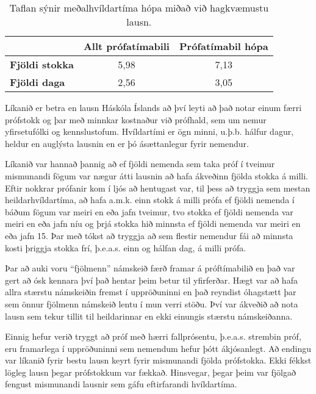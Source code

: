 \documentclass[12pt]{article}
\begin{document}
\newpage
\begin{table}[h]
    \centering
    \begin{tabular}{l|c|c|}
        \cline{2-3}
        & \multicolumn{1}{l|}{\textbf{Allt prófatímabili}} & \multicolumn{1}{l|}{\textbf{Prófatímabil hópa}} \\ \hline
        \multicolumn{1}{|l|}{\textbf{Fjöldi stokka}} & 5,98                                             & 7,13                                            \\ \hline
        \multicolumn{1}{|l|}{\textbf{Fjöldi daga}}   & 2,56                                             & 3,05                                            \\ \hline
    \end{tabular}
    \caption{Taflan sýnir meðalhvíldartíma hópa miðað við hagkvæmustu lausn. }
\end{table}

Líkanið er betra en lausn Háskóla Íslands að því leyti að það notar einum færri prófstokk og þar með minnkar kostnaður við prófhald, sem um nemur yfirsetufólki og kennslustofum. Hvíldartími er ögn minni, u.þ.b. hálfur dagur, heldur en auglýsta lausnin en er þó ásættanlegur fyrir nemendur. 

\medskip
Líkanið var hannað þannig að ef fjöldi nemenda sem taka próf í tveimur mismunandi fögum var nægur átti lausnin að hafa ákveðinn fjölda stokka á milli. Eftir nokkrar prófanir kom í ljós að hentugast var, til þess að tryggja sem mestan heildarhvíldartíma, að hafa a.m.k. einn stokk á milli prófa ef fjöldi nemenda í báðum fögum var meiri en eða jafn tveimur,  tvo stokka ef fjöldi nemenda var meiri en eða jafn níu og þrjá stokka hið minnsta ef fjöldi nemenda var meiri en eða jafn 15. Þar með tókst að tryggja að sem flestir nemendur fái að minnsta kosti þriggja stokka frí, þ.e.a.s. einn og hálfan dag, á milli prófa. 

\medskip
Þar að auki voru “fjölmenn” námskeið færð framar á próftímabilið en það var gert að ósk kennara því það hentar þeim betur til yfirferðar. Hægt var að hafa allra stærstu námskeiðin fremst í uppröðuninni en það reyndist óhagstætt þar sem önnur fjölmenn námskeið lentu í mun verri stöðu. Því var ákveðið að nota lausn sem tekur tillit til heildarinnar en ekki einungis stærstu námskeiðanna.

\medskip
Einnig hefur verið tryggt að próf með hærri fallprósentu, þ.e.a.s. strembin próf, eru framarlega í uppröðuninni sem nemendum hefur þótt ákjósanlegt. 
Að endingu var líkanið fyrir bestu lausn keyrt fyrir mismunandi fjölda prófstokka. Ekki fékkst lögleg lausn þegar prófstokkum var fækkað. Hinsvegar, þegar þeim var fjölgað fengust mismunandi lausnir sem gáfu eftirfarandi hvíldartíma.
\end{document}
